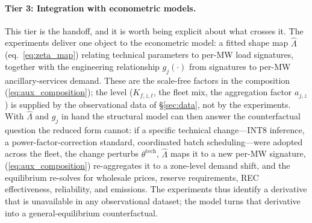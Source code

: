 \documentclass[12pt,letterpaper]{article}
\begin{document}
\paragraph{Tier 3: Integration with econometric models.} This tier is the
handoff, and it is worth being explicit about what crosses it. The experiments
deliver one object to the econometric model: a fitted shape map $\hat\Lambda$
(eq.~\ref{eq:zeta_map}) relating technical parameters to per-MW load
signatures, together with the engineering relationship $g_j(\cdot)$ from
signatures to per-MW ancillary-services demand. These are the scale-free
factors in the composition (\ref{eq:aux_composition}); the level
($K_{f,z,t}$, the fleet mix, the aggregation factor $a_{j,z}$) is supplied by
the observational data of \S\ref{sec:data}, not by the experiments. With
$\hat\Lambda$ and $g_j$ in hand the structural model can then answer the
counterfactual question the reduced form cannot: if a specific technical
change---INT8 inference, a power-factor-correction standard, coordinated batch
scheduling---were adopted across the fleet, the change perturbs
$\theta^{\text{tech}}$, $\hat\Lambda$ maps it to a new per-MW signature,
(\ref{eq:aux_composition}) re-aggregates it to a zone-level demand shift, and
the equilibrium re-solves for wholesale prices, reserve requirements, REC
effectiveness, reliability, and emissions. The experiments thus identify a
derivative that is unavailable in any observational dataset; the model turns
that derivative into a general-equilibrium counterfactual.



\end{document}
